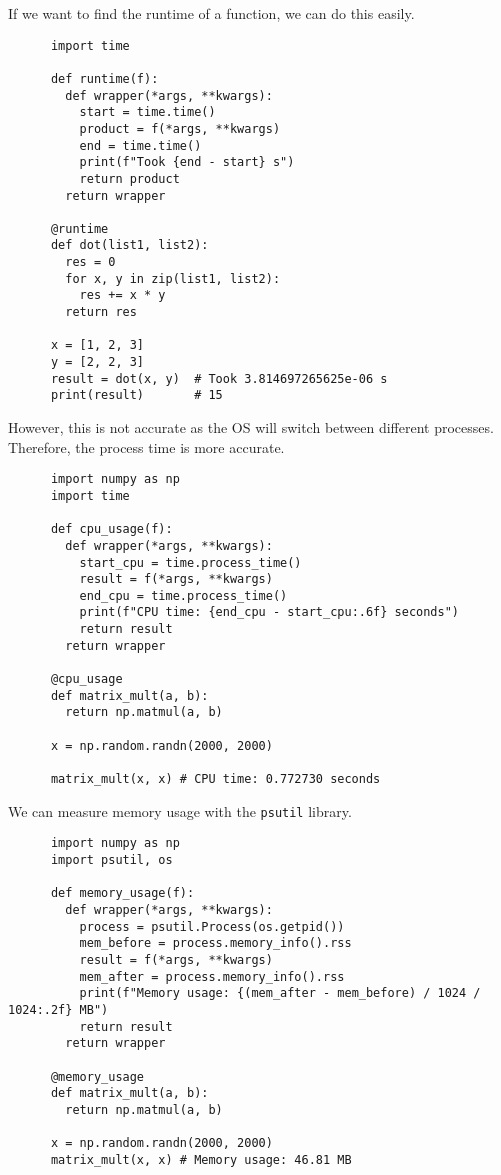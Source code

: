   \begin{example}
    If we want to find the runtime of a function, we can do this easily. 

    \begin{lstlisting}
      import time 

      def runtime(f): 
        def wrapper(*args, **kwargs): 
          start = time.time() 
          product = f(*args, **kwargs) 
          end = time.time() 
          print(f"Took {end - start} s") 
          return product
        return wrapper

      @runtime
      def dot(list1, list2): 
        res = 0 
        for x, y in zip(list1, list2): 
          res += x * y 
        return res

      x = [1, 2, 3]
      y = [2, 2, 3]
      result = dot(x, y)  # Took 3.814697265625e-06 s 
      print(result)       # 15 
    \end{lstlisting}

    However, this is not accurate as the OS will switch between different processes. Therefore, the process time is more accurate. 

    \begin{lstlisting}
      import numpy as np
      import time

      def cpu_usage(f):
        def wrapper(*args, **kwargs):
          start_cpu = time.process_time()
          result = f(*args, **kwargs)
          end_cpu = time.process_time()
          print(f"CPU time: {end_cpu - start_cpu:.6f} seconds")
          return result
        return wrapper

      @cpu_usage
      def matrix_mult(a, b): 
        return np.matmul(a, b)

      x = np.random.randn(2000, 2000)

      matrix_mult(x, x) # CPU time: 0.772730 seconds
    \end{lstlisting}
  \end{example}

  \begin{example}
    We can measure memory usage with the \texttt{psutil} library. 
    \begin{lstlisting}
      import numpy as np
      import psutil, os 

      def memory_usage(f):
        def wrapper(*args, **kwargs):
          process = psutil.Process(os.getpid())
          mem_before = process.memory_info().rss
          result = f(*args, **kwargs)
          mem_after = process.memory_info().rss
          print(f"Memory usage: {(mem_after - mem_before) / 1024 / 1024:.2f} MB")
          return result
        return wrapper

      @memory_usage 
      def matrix_mult(a, b): 
        return np.matmul(a, b)

      x = np.random.randn(2000, 2000)
      matrix_mult(x, x) # Memory usage: 46.81 MB
    \end{lstlisting}
  \end{example}

